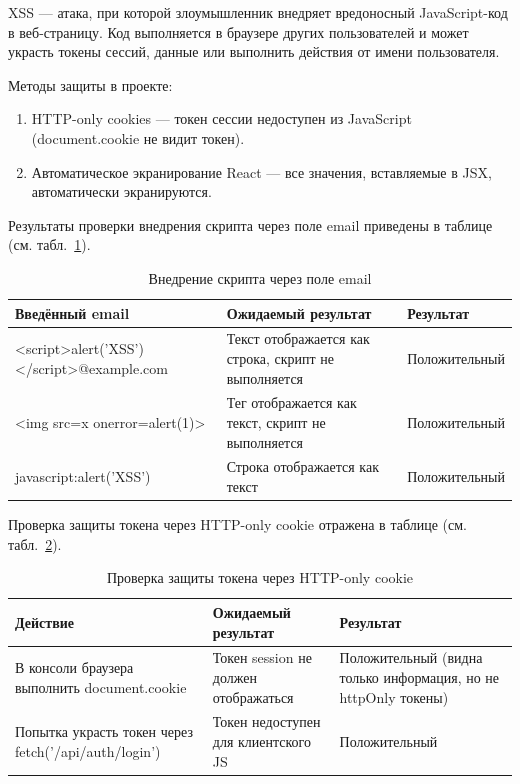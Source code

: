 XSS — атака, при которой злоумышленник внедряет вредоносный JavaScript-код в веб-страницу. Код выполняется в браузере других пользователей и может украсть токены сессий, данные или выполнить действия от имени пользователя.

Методы защиты в проекте:
\begin{enumerate}
\item HTTP-only cookies — токен сессии недоступен из JavaScript (document.cookie не видит токен).
\item Автоматическое экранирование React — все значения, вставляемые в JSX, автоматически экранируются.
\end{enumerate}

Результаты проверки внедрения скрипта через поле email приведены в таблице (см. табл.~\ref{tab:secXssEmail}).

\begin{table}[H]
\caption{\label{tab:secXssEmail}Внедрение скрипта через поле email}
\small
\begin{center}
\vspace{-0.5cm}\begin{tabular}{|p{5cm}|p{7cm}|p{3cm}|}
\hline
Введённый email & Ожидаемый результат & Результат \\ \hline
<script>alert('XSS') </script>@example.com & Текст отображается как строка, скрипт не выполняется & Положительный \\ \hline
<img src=x onerror=alert(1)> & Тег отображается как текст, скрипт не выполняется & Положительный \\ \hline
javascript:alert('XSS') & Строка отображается как текст & Положительный \\ \hline
\end{tabular}
\end{center}
\end{table}

Проверка защиты токена через HTTP-only cookie отражена в таблице (см. табл.~\ref{tab:secHttpOnly}).

\begin{table}[H]
\caption{\label{tab:secHttpOnly}Проверка защиты токена через HTTP-only cookie}
\small
\begin{center}
\vspace{-0.5cm}\begin{tabular}{|p{5cm}|p{5cm}|p{5cm}|}
\hline
Действие & Ожидаемый результат & Результат \\ \hline
В консоли браузера выполнить document.cookie & Токен session не должен отображаться & Положительный (видна только информация, но не httpOnly токены) \\ \hline
Попытка украсть токен через fetch('/api/auth/login') & Токен недоступен для клиентского JS & Положительный \\ \hline
\end{tabular}
\end{center}
\end{table}

